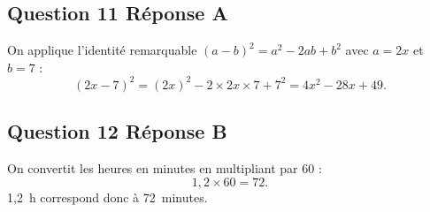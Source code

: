 \subsection*{Question 11 \quad Réponse A}

On applique l'identité remarquable $(a-b)^2 = a^2 - 2ab + b^2$ avec $a = 2x$ et $b = 7$ :
\[(2x-7)^2 = (2x)^2 - 2 \times 2x \times 7 + 7^2 = 4x^2 - 28x + 49.\]

\subsection*{Question 12 \quad Réponse B}

On convertit les heures en minutes en multipliant par 60 :
\[1,2 \times 60 = 72.\]
1,2~h correspond donc à 72~minutes.

